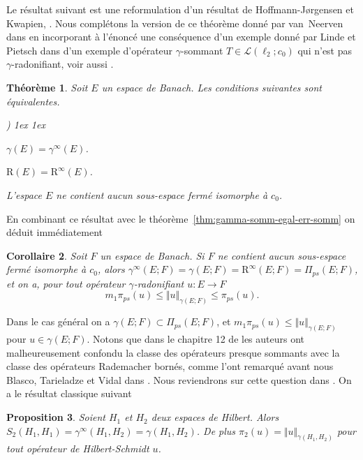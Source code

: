 \documentclass{smfart}
\theoremstyle{plain}
\newtheorem{theorem}{Théorème}[section]
\newtheorem{corollary}[theorem]{Corollaire}
\newtheorem{proposition}[theorem]{Proposition}
\theoremstyle{definition}
\newcommand{\err}{\mathrm{R}}
\newcommand {\BOUNDED} {{\mathcal L}}
\newcounter{aufzi}
\newenvironment{aufzi}{\begin{list}{ {\upshape\alph{aufzi})}}{
        \usecounter{aufzi}
        \topsep1ex
        \parsep0cm
        \itemsep1ex
        \leftmargin0.8cm
        \labelwidth0.5cm
        \labelsep0.3cm
}}
{\end{list}}
\begin{document}
\smallskip

Le résultat suivant est une reformulation d'un résultat de
Hoffmann-J\o{}rgensen et Kwapien, \cite{HK,Kwap}. Nous complétons la
version de ce théorème donné par van~Neerven dans
\cite[Théorème~4.2]{jvn} en incorporant à l'énoncé une conséquence
d'un exemple donné par Linde et Pietsch dans \cite{Pietsch} d'un
exemple d'opérateur $\gamma$-sommant $T\in \BOUNDED(\ell_2; c_0)$ qui
n'est pas $\gamma$-radonifiant, voir aussi \cite[Exemple 4.4]{jvn}.


\begin{theorem}
Soit $E$ un espace de Banach. Les conditions suivantes sont équivalentes.
\begin{aufzi}
  \item $\gamma(E)=\gamma^\infty(E)$.
  \item $\err(E)=\err^\infty(E)$.
  \item L'espace $E$ ne contient aucun sous-espace fermé isomorphe
    à $c_0$.
  \end{aufzi}
\end{theorem}

\noindent En combinant ce résultat avec le
théorème~\ref{thm:gamma-somm-egal-err-somm} on déduit immédiatement

\begin{corollary} Soit $F$ un espace de Banach. Si $F$ ne contient
  aucun sous-espace fermé isomorphe à $c_0$, alors
  $\gamma^{\infty}(E; F)=\gamma(E; F)=\err^\infty(E; F)=\Pi_{ps}(E; F)$, et on a,
  pour tout opérateur $\gamma$-radonifiant $u:E\to F$
\[
    m_1\pi_{ps}(u)\le \Vert u \Vert_{\gamma(E; F)}\le \pi_{ps}(u).
\]
\end{corollary}

\noindent Dans le cas général on a $\gamma(E; F)\subset \Pi_{ps}(E; F)$,
et $m_1\pi_{ps}(u)\le \Vert u \Vert_{\gamma(E; F)}$ pour $u \in
\gamma(E; F)$.  Notons que dans le chapitre 12 de \cite{DJT} les
auteurs ont malheureusement confondu la classe des opérateurs presque
sommants avec la classe des opérateurs Rademacher bornés, comme l'ont
remarqué avant nous Blasco, Tarieladze et Vidal dans \cite{BTV}. Nous
reviendrons sur cette question dans \cite{AEH}. 
On a le résultat
classique suivant

\begin{proposition} 
  Soient $H_1$ et $H_2$ deux espaces de Hilbert. Alors
  $S_2(H_1,H_1)=\gamma^{\infty}(H_1,H_2)=\gamma(H_1,H_2)$. De plus
  $\pi_2(u)=\Vert u\Vert_{\gamma(H_1,H_2)}$ pour tout opérateur de
  Hilbert-Schmidt $u$.
\end{proposition}
\end{document}
